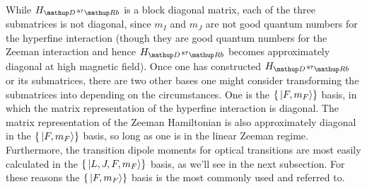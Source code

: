 While $H_{\up{D}\,^{87}\up{Rb}}$ is a block diagonal matrix, each of the three submatrices is not diagonal, since $m_I$ and $m_J$ are not good quantum numbers for the hyperfine interaction (though they are good quantum numbers for the Zeeman interaction and hence $H_{\up{D}\,^{87}\up{Rb}}$ becomes approximately diagonal at high magnetic field). Once one has constructed $H_{\up{D}\,^{87}\up{Rb}}$ or its submatrices, there are two other bases one might consider transforming the submatrices into depending on the circumstances. One is the $\{\ket{F, m_F}\}$ basis, in which the matrix representation of the hyperfine interaction is diagonal. The matrix representation of the Zeeman Hamiltonian is also approximately diagonal in the $\{\ket{F, m_F}\}$ basis, so long as one is in the linear Zeeman regime. Furthermore, the transition dipole moments for optical transitions are most easily calculated in the $\{\ket{L, J, F, m_F}\}$ basis, as we'll see in the next subsection. For these reasons the $\{\ket{F, m_F}\}$ basis is the most commonly used and referred to.


